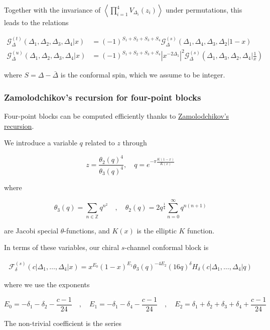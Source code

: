 \documentclass[a4paper]{article}
\numberwithin{equation}{section}
\begin{document}
Together with the invariance of \(\left\langle \prod_{i=1}^4 V_{\Delta_i}(z_i) \right\rangle\) under permutations, this leads to the relations

\begin{align}
\mathcal{G}^{(t)}_{\Delta}(\Delta_1,\Delta_2,\Delta_3,\Delta_4|x)
&= (-1)^{S_1+S_2+S_3+S_4}
\mathcal{G}^{(s)}_{\Delta}(\Delta_1,\Delta_4,\Delta_3,\Delta_2|1-x)
\\
\mathcal{G}^{(u)}_\Delta(\Delta_1,\Delta_2,\Delta_3,\Delta_4|x)
&= (-1)^{S_1+S_2+S_3+S_4}
\left|x^{-2\Delta_1}\right|^2 \mathcal{G}^{(s)}_\Delta(\Delta_1,\Delta_3,\Delta_2,\Delta_4|\tfrac{1}{x})
\end{align}

where \(S=\Delta-\bar\Delta\) is the conformal spin, which we assume to be integer.
\subsubsection*{Zamolodchikov's recursion for four-point blocks}
\label{sec:orgab31910}

Four-point blocks can be computed efficiently thanks to \href{https://en.wikipedia.org/wiki/Virasoro\_conformal\_block}{Zamolodchikov's recursion}.

We introduce a variable \(q\) related to \(z\) through

\[
z = \frac{\theta_2(q)^4}{\theta_3(q)^4}, \quad q = e^{-\pi\frac{K(1-x)}{ K(x)}}
\]

where

\[
\theta_3(q) = \sum_{n\in\mathbb{Z}} q^{n^2} \quad , \quad \theta_2(q) = 2q^\frac14\sum_{n=0}^\infty q^{n(n+1)}
\]


are Jacobi special \(\theta\)-functions, and \(K(x)\) is the elliptic \(K\) function.

In terms of these variables, our chiral \(s\)-channel conformal block is

\begin{align}
\label{eq:chiral_block}
\mathcal{F}^{(s)}_{\delta}(c | \Delta_{1}, \dots, \Delta_{4} | x) =  x^{E_0} (1-x)^{E_1} \theta_3(q)^{-4E_2}
(16q)^{\delta} H_{\delta}(c | \Delta_{1},\dots, \Delta_{4} | q)
\end{align}

where we use the exponents

\[
E_0 = -\delta_1-\delta_2-\frac{c-1}{24} \quad , \quad E_1 = -\delta_1-\delta_4-\frac{c-1}{24} \quad ,
\quad E_2 = \delta_1+\delta_2+\delta_3+\delta_4+\frac{c-1}{24}
\]

The non-trivial coefficient is the series
\end{document}
